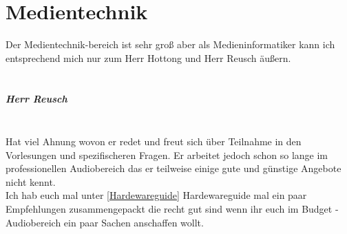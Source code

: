 \chapter{Medientechnik}

Der Medientechnik-bereich ist sehr groß aber als Medieninformatiker kann ich entsprechend mich nur zum Herr Hottong und Herr Reusch äußern.
\\~\\
\paragraph*{Herr Reusch}~\\ Hat viel Ahnung wovon er redet und freut sich über Teilnahme in den Vorlesungen und spezifischeren Fragen. Er arbeitet jedoch schon so lange im professionellen Audiobereich das er teilweise einige gute und günstige Angebote nicht kennt.\\ Ich hab euch mal unter \ref{Hardewareguide} Hardewareguide mal ein paar Empfehlungen zusammengepackt die recht gut sind wenn ihr euch im \glqq Budget \grqq -Audiobereich ein paar Sachen anschaffen wollt. 



